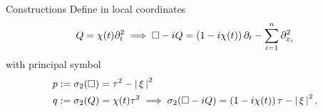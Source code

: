 \documentclass{beamer}
\begin{document}
\begin{frame}{Constructions}
Define in local coordinates
\begin{align*}
Q = \chi(t) \partial_t^2 \implies \Box - iQ = \left(1 - i\chi(t)\right) \partial_{t} - \sum_{i = 1}^n \partial_{x_i}^2 
\end{align*}
with principal symbol 
\begin{align*}
p & := \sigma_2(\Box) = \tau^2 - \left|\, \xi\,\right|^2 \\
q & := \sigma_2(Q) = \chi(t) \tau^2 \implies \sigma_2(\Box - iQ) = \left(1 - i\chi(t)\right) \tau - \left|\, \xi\,\right|^2. 
\end{align*}

%    
%    
%    

\end{frame} 
\end{document}
